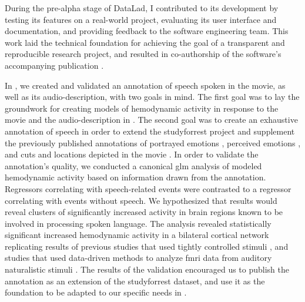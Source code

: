 
During the pre-alpha stage of DataLad, I contributed to its development by
testing its features on a real-world project, evaluating its user interface and
documentation, and providing feedback to the software engineering team.
This work laid the technical foundation for achieving the goal of a transparent
and reproducible research project, and resulted in co-authorship of the
software's accompanying publication \citep[s.][]{halchenko2021datalad}.



In \citet{haeusler2021speechanno}, we created and validated an annotation of
speech spoken in the movie, as well as its audio-description, with two goals in
mind.
The first goal was to lay the groundwork for creating models of hemodynamic
activity in response to the movie and the audio-description in
\citet{haeusler2022processing}.
The second goal was to create an exhaustive annotation of speech in order to
extend the studyforrest project and supplement the previously published
annotations of portrayed emotions \citep{labs2015portrayed}, perceived emotions
\citep{lettieri2019emotionotopy}, and cuts and locations depicted in the movie
\citep{haeusler2016cutanno}.
In order to validate the annotation's quality, we conducted a canonical \ac{glm}
analysis of modeled hemodynamic activity based on information drawn from the
annotation.
Regressors correlating with speech-related events were contrasted to a regressor
correlating with events without speech.
We hypothesized that results would reveal clusters of significantly increased
activity in brain regions known to be involved in processing spoken language.
The analysis revealed statistically significant increased hemodynamic activity
in a bilateral cortical network replicating results of previous studies that
used tightly controlled stimuli \citep[s.][for reviews]{friederici2011brain,
hickok2007cortical,price2012twentyyears}, and studies that used data-driven
methods to analyze \ac{fmri} data from auditory naturalistic stimuli
\citep{honey2012not, lerner2011topographic, silbert2014coupled}.
The results of the validation encouraged us to publish the annotation as an
extension of the studyforrest dataset, and use it as the foundation to be
adapted to our specific needs in \citet{haeusler2022processing}.

